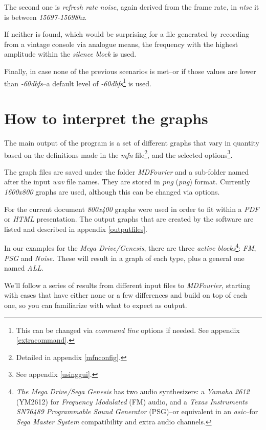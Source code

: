 \documentclass[10pt,a4paper]{report}
\newcommand{\define}[1]{\textit{\acrlong{#1}} (\textit{\acrshort{#1}})}
\newcommand{\ac}[1]{\textit{\acrshort{#1}}}
\newcommand{\hz}[1]{\textit{#1\acrshort{hz}}}
\newcommand{\db}[1]{\textit{#1\acrshort{dbfs}}}
\begin{document}
The second one is \textit{refresh rate noise}, again derived from the frame rate, in \ac{ntsc} it is between \hz{15697-15698}. 

If neither is found, which would be surprising for a file generated by recording from a vintage console via analogue means, the frequency with the highest amplitude within the \textit{silence block} is used. 

Finally, in case none of the previous scenarios is met--or if those values are lower than \db{-60}--a default level of \db{-60}\footnote{This can be changed via \textit{command line} options if needed. See appendix \ref{extracommand}.} is used. 

\chapter{How to interpret the graphs}
\label{howtographs}

The main output of the program is a set of different graphs that vary in quantity based on the definitions made in the \textit{mfn} file\footnote{Detailed in appendix \ref{mfnconfig}.}, and the selected options\footnote{See appendix \ref{usinggui}.}.

The graph files are saved under the folder \textit{MDFourier} and a sub-folder named after the input \ac{wav} file names. They are stored in \define{png} format. Currently \textit{1600x800} graphs are used, although this can be changed via options. 

For the current document \textit{800x400} graphs were used in order to fit within a \textit{PDF} or \textit{HTML} presentation. The output graphs that are created by the software are listed and described in appendix \ref{outputfiles}.

In our examples for the \textit{Mega Drive/Genesis}, there are three \textit{active blocks}\footnote{\textit{The Mega Drive/Sega Genesis} has two audio synthesizers: a \textit{Yamaha 2612} (YM2612) for \textit{Frequency Modulated} (FM) audio, and a \textit{Texas Instruments SN76489 Programmable Sound Generator} (PSG)--or equivalent in an \ac{asic}--for \textit{Sega Master System} compatibility and extra audio channels.}: \textit{FM}, \textit{PSG} and \textit{Noise}. These will result in a graph of each type, plus a general one named \textit{ALL}.

We'll follow a series of results from different input files to \textit{MDFourier}, starting with cases that have either none or a few differences and build on top of each one, so you can familiarize with what to expect as output.
\end{document}

